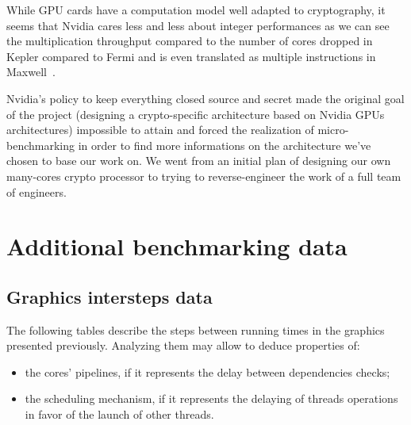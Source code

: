 \documentclass{report}
\begin{document}
    While GPU cards have a computation model well adapted to cryptography, it seems that Nvidia
    cares less and less about integer performances as we can see the multiplication throughput
    compared to the number of cores dropped in Kepler compared to Fermi and is even translated as
    multiple instructions in Maxwell~\cite{cudaprog}.
   
    Nvidia's policy to keep everything closed source and secret made the original 
    goal of the project (designing a crypto-specific architecture based on Nvidia GPUs architectures)
    impossible to attain and forced the realization of micro-benchmarking 
    in order to find more informations on the architecture we've chosen to base our work on. We went 
    from an initial plan of designing our own many-cores crypto processor to trying to 
    reverse-engineer the work of a full team of engineers.

  \appendix 
   
\chapter{Additional benchmarking data}
    \section{Graphics intersteps data}
    The following tables describe the steps between running times in the graphics presented previously. Analyzing them may allow to deduce properties of: 
    \begin{itemize} 
        \item the cores' pipelines, if it represents the delay between dependencies checks;
        \item the scheduling mechanism, if it represents the delaying of threads operations in favor of the launch of other threads.
    \end{itemize}
    
    \centering
    
    
    \pagebreak
\end{document}
